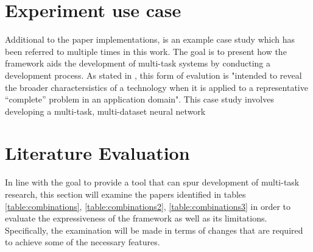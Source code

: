 \section{Experiment use case}

% 




Additional to the paper implementations, is an example case study which has been referred to multiple times in this work. The goal is to present how the framework aids the development of multi-task systems by conducting a development process. As stated in \cite{brown1996framework}, this form of evalution is "intended to reveal the broader charactersistics of a technology when it is applied to a representative “complete” problem in an application domain". This case study involves developing a multi-task, multi-dataset neural network  \\



\section{Literature Evaluation}


In line with the goal to provide a tool that can spur development of multi-task research, this section will examine the papers identified in tables \ref{table:combinations}, \ref{table:combinations2}, \ref{table:combinations3} in order to evaluate the expressiveness of the framework as well as its limitations. Specifically, the examination will be made in terms of changes that are required to achieve some of the necessary features. \\

